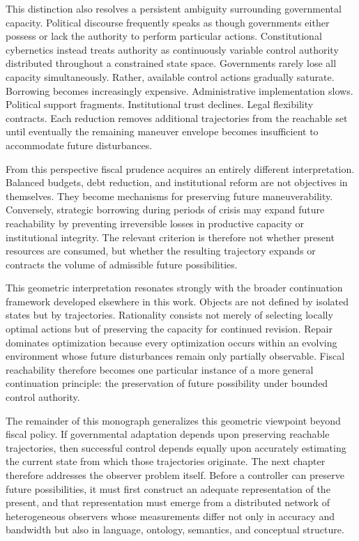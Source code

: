 \documentclass[12pt,a4paper]{article}
\begin{document}
This distinction also resolves a persistent ambiguity surrounding governmental capacity. Political discourse frequently speaks as though governments either possess or lack the authority to perform particular actions. Constitutional cybernetics instead treats authority as continuously variable control authority distributed throughout a constrained state space. Governments rarely lose all capacity simultaneously. Rather, available control actions gradually saturate. Borrowing becomes increasingly expensive. Administrative implementation slows. Political support fragments. Institutional trust declines. Legal flexibility contracts. Each reduction removes additional trajectories from the reachable set until eventually the remaining maneuver envelope becomes insufficient to accommodate future disturbances.

From this perspective fiscal prudence acquires an entirely different interpretation. Balanced budgets, debt reduction, and institutional reform are not objectives in themselves. They become mechanisms for preserving future maneuverability. Conversely, strategic borrowing during periods of crisis may expand future reachability by preventing irreversible losses in productive capacity or institutional integrity. The relevant criterion is therefore not whether present resources are consumed, but whether the resulting trajectory expands or contracts the volume of admissible future possibilities.

This geometric interpretation resonates strongly with the broader continuation framework developed elsewhere in this work. Objects are not defined by isolated states but by trajectories. Rationality consists not merely of selecting locally optimal actions but of preserving the capacity for continued revision. Repair dominates optimization because every optimization occurs within an evolving environment whose future disturbances remain only partially observable. Fiscal reachability therefore becomes one particular instance of a more general continuation principle: the preservation of future possibility under bounded control authority.

The remainder of this monograph generalizes this geometric viewpoint beyond fiscal policy. If governmental adaptation depends upon preserving reachable trajectories, then successful control depends equally upon accurately estimating the current state from which those trajectories originate. The next chapter therefore addresses the observer problem itself. Before a controller can preserve future possibilities, it must first construct an adequate representation of the present, and that representation must emerge from a distributed network of heterogeneous observers whose measurements differ not only in accuracy and bandwidth but also in language, ontology, semantics, and conceptual structure.
\end{document}
